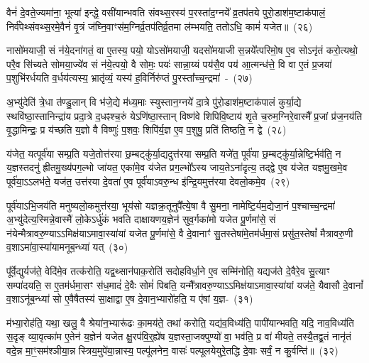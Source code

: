 वैनं॑ दे॒वते॒ज्यमा॑ना॒ भूत्या॑ इन्द्धे॒ वसी॑यान्भवति संवथ्स॒रस्य॑ प॒रस्ता॑\-द॒ग्नये᳚ व्र॒तप॑तये पुरो॒डाश॑\-म॒ष्टा\-क॑पालं॒ निर्व॑पेथ्संवथ्स॒रमे॒वैनं॑ वृ॒त्रं ज॑घ्नि॒वाꣳस॑म॒ग्निर्व्र॒तप॑तिर्व्र॒तमा ल॑म्भयति॒ ततो\-ऽधि॒ कामं॑ यजेत॥~(२६)

{\anuvakamend[{ए॒तान्तदौदु॑म्बर॒ꣴ॒ स्वा त्रि॒ꣳ॒शच्च॑}]}%

नासो॑मयाजी॒ सं न॑ये॒दना॑गतं॒ वा ए॒तस्य॒ पयो॒ यो\-ऽसो॑मयाजी॒ यदसो॑मयाजी स॒न्नये᳚त्परिमो॒ष ए॒व सो\-ऽनृ॑तं करो॒त्यथो॒ परै॒व सि॑च्यते सोमया॒ज्ये॑व सं न॑ये॒त्पयो॒ वै सोमः॒ पयः॑ सान्ना॒य्यं पय॑सै॒व पय॑ आ॒त्मन्ध॑त्ते॒ वि वा ए॒तं प्र॒जया॑ प॒शुभि॑रर्धयति व॒र्धय॑त्यस्य॒ भ्रातृ॑व्यं॒ यस्य॑ ह॒विर्निरु॑प्तं पु॒रस्ता᳚च्च॒न्द्रमा॑~-~(२७)

अ॒भ्यु॑देति॑ त्रे॒धा त॑ण्डु॒लान् वि भ॑जे॒द्ये म॑ध्य॒माः स्युस्तान॒ग्नये॑ दा॒त्रे पु॑रो॒डाश॑म॒ष्टाक॑पालं कुर्या॒द्ये स्थवि॑ष्ठा॒स्तानिन्द्रा॑य प्रदा॒त्रे द॒धꣴश्च॒रुं ये\-ऽणि॑ष्ठा॒स्तान् विष्ण॑वे शिपिवि॒ष्टाय॑ शृ॒ते च॒रुम॒ग्निरे॒वास्मै᳚ प्र॒जां प्र॑ज॒नय॑ति वृ॒द्धामिन्द्रः॒ प्र य॑च्छति य॒ज्ञो वै विष्णुः॑ प॒शवः॒ शिपि॑र्य॒ज्ञ ए॒व प॒शुषु॒ प्रति॑ तिष्ठति॒ न द्वे~(२८)

य॑जेत॒ यत्पूर्व॑या सम्प्र॒ति यजे॒तोत्त॑रया छ॒म्बट्कु॑र्या॒द्यदुत्त॑रया सम्प्र॒ति यजे॑त॒ पूर्व॑या छ॒म्बट्कु॑र्या॒न्नेष्टि॒र्भव॑ति॒ न य॒ज्ञस्तदनु॑ ह्रीतमु॒ख्य॑पग॒ल्भो जा॑यत॒ एका॑मे॒व य॑जेत प्रग॒ल्भो᳚\-ऽस्य जाय॒ते\-ऽना॑दृत्य॒ तद्द्वे ए॒व य॑जेत यज्ञमु॒खमे॒व पूर्व॑या॒ऽऽलभ॑ते॒ यज॑त॒ उत्त॑रया दे॒वता॑ ए॒व पूर्व॑या\-ऽवरु॒न्ध इ॑न्द्रि॒यमुत्त॑रया देवलो॒कमे॒व~(२९)

पूर्व॑याऽभि॒जय॑ति मनुष्यलो॒कमुत्त॑रया॒ भूय॑सो यज्ञक्र॒तूनुपै᳚त्ये॒षा वै सु॒मना॒ नामेष्टि॒र्यम॒द्येजा॒नं प॒श्चाच्च॒न्द्रमा॑ अ॒भ्यु॑देत्य॒स्मिन्ने॒वास्मै॑ लो॒के\-ऽर्धु॑कं भवति दाक्षायणय॒ज्ञेन॑ सुव॒र्गका॑मो यजेत पू॒र्णमा॑से॒ सं न॑येन्मैत्रावरु॒ण्या\-ऽ\-ऽ\-मिक्ष॑याऽमावा॒स्या॑यां यजेत पू॒र्णमा॑से॒ वै दे॒वानाꣳ॑ सु॒तस्तेषा॑मे॒तम॑र्धमा॒सं प्रसु॑त॒स्तेषां᳚ मैत्रावरु॒णी व॒शाऽमा॑वा॒स्या॑यामनूब॒न्ध्या॑ यत्~(३०)

पू᳚र्वे॒द्युर्यज॑ते॒ वेदि॑मे॒व तत्क॑रोति॒ यद्व॒थ्सान॑पाक॒रोति॑ सदोहविर्धा॒ने ए॒व सम्मि॑नोति॒ यद्यज॑ते दे॒वैरे॒व सु॒त्याꣳ सम्पा॑दयति॒ स ए॒तम॑र्धमा॒सꣳ स॑ध॒मादं॑ दे॒वैः सोमं॑ पिबति॒ यन्मै᳚त्रावरु॒ण्या\-ऽ\-ऽ\-मिक्ष॑याऽमावा॒स्या॑यां यज॑ते॒ यैवासौ दे॒वानां᳚ व॒शाऽनू॑ब॒न्ध्या॑ सो ए॒वैषैतस्य॑ सा॒क्षाद्वा ए॒ष दे॒वान॒भ्यारो॑हति॒ य ए॑षां य॒ज्ञ-~(३१)

म॑भ्या॒रोह॑ति॒ यथा॒ खलु॒ वै श्रेया॑न॒भ्यारू॑ढः का॒मय॑ते॒ तथा॑ करोति॒ यद्य॑व॒विध्य॑ति॒ पापी॑यान्भवति॒ यदि॒ नाव॒विध्य॑ति स॒दृङ् व्या॒वृत्का॑म ए॒तेन॑ य॒ज्ञेन॑ यजेत क्षु॒रप॑वि॒र्॒\mbox{}ह्ये॑ष य॒ज्ञस्ता॒जक्पुण्यो॑ वा॒ भव॑ति॒ प्र वा॑ मीयते॒ तस्यै॒तद्व्र॒तं नानृ॑तं वदे॒न्न मा॒ꣳ॒सम॑श्ञीया॒न्न स्त्रिय॒\-मु\-पे॑या॒न्नास्य॒ पल्पू॑लनेन॒ वासः॑ पल्पूलयेयुरे॒तद्धि दे॒वाः सर्वं॒ न कु॒र्वन्ति॑॥~(३२)

